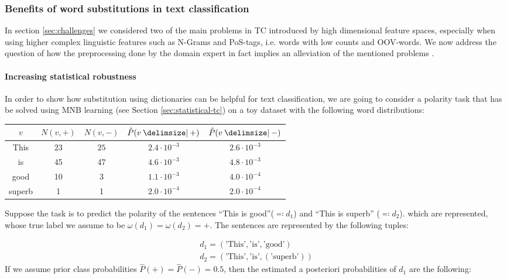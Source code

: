 \subsubsection{Benefits of word substitutions in text classification}

In section \ref{sec:challenges} we considered two of the main problems in TC
introduced by high dimensional feature spaces, especially when using higher
complex linguistic features such as N-Grams and PoS-tags, i.e. words
with low counts and OOV-words. We now address the question of how the
preprocessing done by the domain expert in fact implies an alleviation of the mentioned problems .

\paragraph{Increasing statistical robustness}
In order to show how substitution using dictionaries can be helpful for text classification,
we are going to consider a polarity task that has be solved using MNB learning (see
Section \ref{sec:statistical-tc}) on a toy dataset with the following word
distributions:

\begin{center}
\begin{tabular}{|c|c|c|c|c}
$v$ & $N(v, +)$ & $N(v,-)$ & $\hat{P}(v\given +)$ & $\hat{P}(v \given -)$ \\
\hline
This & $23$ & $25$ & $2.4\cdot 10^{-3}$  & $2.6 \cdot 10^{-3}$\\
is & 45 & 47 & $4.6\cdot 10^{-3}$ &  $4.8\cdot 10^{-3}$ \\
good & 10 & 3 & $1.1 \cdot 10^{-3}$ & $4.0 \cdot 10^{-4}$ \\
superb & 1 & 1 & $2.0 \cdot 10^{-4}$ & $2.0 \cdot 10^{-4}$   
\end{tabular}
\end{center}
Suppose the task is to predict the polarity of the sentences 
``This is good''($\eqqcolon d_1$) and ``This is superb'' ($\eqqcolon d_2$).
which are represented, whose true label we assume to be $\omega(d_1) =
\omega(d_2) = +$. The sentences are represented by the following tuples:

\begin{equation*}
\begin{split}
d_1 = (\text{'This'}, \text{'is'}, \text{'good'}) \\
d_2 = (\text{'This'}, \text{'is'}, (\text{'superb'}))
\end{split}
\end{equation*}
If we assume prior class probabilities $\hat{P}(+) = \hat{P}(-) = 0.5$,
then the estimated a posteriori probabilities of $d_1$ are the following:

